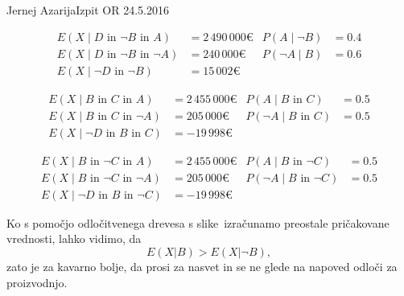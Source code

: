 \begin{naloga}{Jernej Azarija}{Izpit OR 24.5.2016}
\begin{odgovor}
    \begin{align*}
    E(X \mid D \text{ in }\neg B \text{ in } A) &= 2\, 490\, 000 € & P(A \mid \neg B) &= 0.4\\
    E(X \mid D \text{ in } \neg B \text{ in } \neg A) &= 240\, 000 € & P(\neg A \mid B)& = 0.6 \\
    E(X \mid \neg D \text{ in } \neg B) &= 15 \, 002 €
    \end{align*}
    
    \begin{align*}
    E(X \mid B \text{ in }C \text{ in } A) &=2\,455\, 000 € & P(A \mid B \text{ in } C) &= 0.5\\
    E(X \mid B \text{ in }C \text{ in }\neg A) &=205\, 000 € & P(\neg A \mid B \text{ in } C) &= 0.5\\
    E(X \mid \neg D \text{ in } B \text{ in } C) &= -19\, 998 €
    \end{align*}
    
    \begin{align*}
    E(X \mid B \text{ in } \neg C \text{ in } A) &=2\, 455\, 000 € & P(A \mid B \text{ in } \neg C) &= 0.5\\
    E(X \mid B \text{ in } \neg C \text{ in }\neg A) &=205\, 000 € & P(\neg A \mid B \text{ in } \neg C) &= 0.5\\
    E(X \mid \neg D \text{ in } B \text{ in } \neg C) &= -19\, 998 €
    \end{align*}
    
    
    Ko s pomočjo odločitvenega drevesa s slike~\fig izračunamo preostale pričakovane vrednosti, lahko vidimo, da
    $$
     E(X|B) > E(X|\neg B) ,
    $$
    zato je za kavarno bolje, da prosi za nasvet in se ne glede na napoved odloči za proizvodnjo.

    \begin{slika}
        \makebox[\textwidth][c]{
            \pgfslika
        }
    \end{slika}
\end{odgovor}
\end{naloga}

